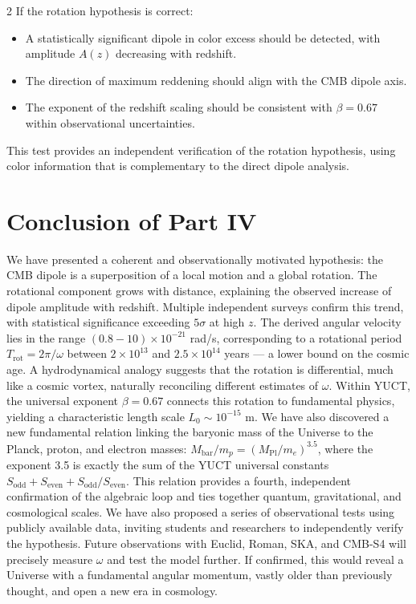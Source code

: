 \documentclass[12pt,a4paper]{article}
\begin{document}
\begin{multicols}{2}
		If the rotation hypothesis is correct:
		\begin{itemize}
			\item A statistically significant dipole in color excess should be detected, with amplitude \(A(z)\) decreasing with redshift.
			\item The direction of maximum reddening should align with the CMB dipole axis.
			\item The exponent of the redshift scaling should be consistent with \(\beta = 0.67\) within observational uncertainties.
		\end{itemize}
		
		This test provides an independent verification of the rotation hypothesis, using color information that is complementary to the direct dipole analysis.
		
		\section{Conclusion of Part IV}
		
		We have presented a coherent and observationally motivated hypothesis: the CMB dipole is a superposition of a local motion and a global rotation. The rotational component grows with distance, explaining the observed increase of dipole amplitude with redshift. Multiple independent surveys confirm this trend, with statistical significance exceeding \(5\sigma\) at high \(z\). The derived angular velocity lies in the range \((0.8-10)\times10^{-21}\) rad/s, corresponding to a rotational period \(T_{\text{rot}} = 2\pi/\omega\) between \(2\times10^{13}\) and \(2.5\times10^{14}\) years — a lower bound on the cosmic age. A hydrodynamical analogy suggests that the rotation is differential, much like a cosmic vortex, naturally reconciling different estimates of \(\omega\). Within YUCT, the universal exponent \(\beta = 0.67\) connects this rotation to fundamental physics, yielding a characteristic length scale \(L_0 \sim 10^{-15}\) m. We have also discovered a new fundamental relation linking the baryonic mass of the Universe to the Planck, proton, and electron masses: \(M_{\mathrm{bar}}/m_p = (M_{\mathrm{Pl}}/m_e)^{3.5}\), where the exponent 3.5 is exactly the sum of the YUCT universal constants \(S_{\mathrm{odd}} + S_{\mathrm{even}} + S_{\mathrm{odd}}/S_{\mathrm{even}}\). This relation provides a fourth, independent confirmation of the algebraic loop and ties together quantum, gravitational, and cosmological scales. We have also proposed a series of observational tests using publicly available data, inviting students and researchers to independently verify the hypothesis. Future observations with Euclid, Roman, SKA, and CMB-S4 will precisely measure \(\omega\) and test the model further. If confirmed, this would reveal a Universe with a fundamental angular momentum, vastly older than previously thought, and open a new era in cosmology.
		

\end{multicols}
\end{document}
